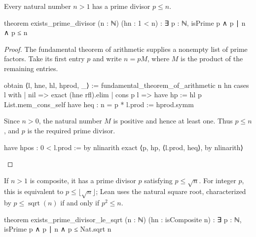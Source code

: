 \begin{lemma}
  \label{ent:lem:prime-divisor-exists}
  Every natural number $n>1$ has a prime divisor $p\le n$.

  \begin{lean}
    theorem exists_prime_divisor (n : ℕ) (hn : 1 < n) :
        ∃ p : ℕ, isPrime p ∧ p ∣ n ∧ p ≤ n
  \end{lean}
\end{lemma}

\begin{proof}
  The fundamental theorem of arithmetic supplies a nonempty list of prime factors.
  Take its first entry $p$ and write $n=pM$, where $M$ is the product of the remaining entries.

  \begin{lean}
    obtain ⟨l, hne, hl, hprod, _⟩ := fundamental_theorem_of_arithmetic n hn
    cases l with
    | nil => exact (hne rfl).elim
    | cons p l =>
      have hp := hl p List.mem_cons_self
      have heq : n = p * l.prod := hprod.symm
  \end{lean}

  Since $n>0$, the natural number $M$ is positive and hence at least one.
  Thus $p\le n$, and $p$ is the required prime divisor.

  \begin{lean}
    have hpos : 0 < l.prod := by
      nlinarith
    exact ⟨p, hp, ⟨l.prod, heq⟩, by nlinarith⟩
  \end{lean}
\end{proof}

\begin{theorem}
  \label{ent:thm:composite-prime-divisor-sqrt}
  If $n>1$ is composite, it has a prime divisor $p$ satisfying $p\le\sqrt n$.
  For integer $p$, this is equivalent to $p\le\lfloor\sqrt n\rfloor$; Lean uses the natural square
  root, characterized by $p\le\operatorname{sqrt}(n)$ if and only if $p^2\le n$.

  \begin{lean}
    theorem exists_prime_divisor_le_sqrt (n : ℕ) (hn : isComposite n) :
        ∃ p : ℕ, isPrime p ∧ p ∣ n ∧ p ≤ Nat.sqrt n
  \end{lean}
\end{theorem}

